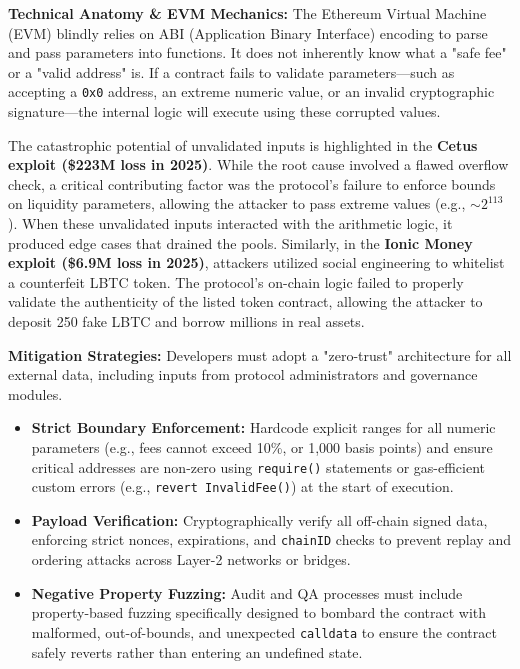 \textbf{Technical Anatomy \& EVM Mechanics:} The Ethereum Virtual Machine (EVM) blindly relies on ABI (Application Binary Interface) encoding to parse and pass parameters into functions. It does not inherently know what a "safe fee" or a "valid address" is. If a contract fails to validate parameters—such as accepting a \texttt{0x0} address, an extreme numeric value, or an invalid cryptographic signature—the internal logic will execute using these corrupted values. 

The catastrophic potential of unvalidated inputs is highlighted in the \textbf{Cetus exploit (\$223M loss in 2025)}. While the root cause involved a flawed overflow check, a critical contributing factor was the protocol's failure to enforce bounds on liquidity parameters, allowing the attacker to pass extreme values (e.g., $\sim 2^{113}$). When these unvalidated inputs interacted with the arithmetic logic, it produced edge cases that drained the pools. Similarly, in the \textbf{Ionic Money exploit (\$6.9M loss in 2025)}, attackers utilized social engineering to whitelist a counterfeit LBTC token. The protocol's on-chain logic failed to properly validate the authenticity of the listed token contract, allowing the attacker to deposit 250 fake LBTC and borrow millions in real assets. 

\textbf{Mitigation Strategies:} Developers must adopt a "zero-trust" architecture for all external data, including inputs from protocol administrators and governance modules.
\begin{itemize}
    \item \textbf{Strict Boundary Enforcement:} Hardcode explicit ranges for all numeric parameters (e.g., fees cannot exceed 10\%, or 1,000 basis points) and ensure critical addresses are non-zero using \texttt{require()} statements or gas-efficient custom errors (e.g., \texttt{revert InvalidFee()}) at the start of execution.
    \item \textbf{Payload Verification:} Cryptographically verify all off-chain signed data, enforcing strict nonces, expirations, and \texttt{chainID} checks to prevent replay and ordering attacks across Layer-2 networks or bridges.
    \item \textbf{Negative Property Fuzzing:} Audit and QA processes must include property-based fuzzing specifically designed to bombard the contract with malformed, out-of-bounds, and unexpected \texttt{calldata} to ensure the contract safely reverts rather than entering an undefined state.
\end{itemize}


